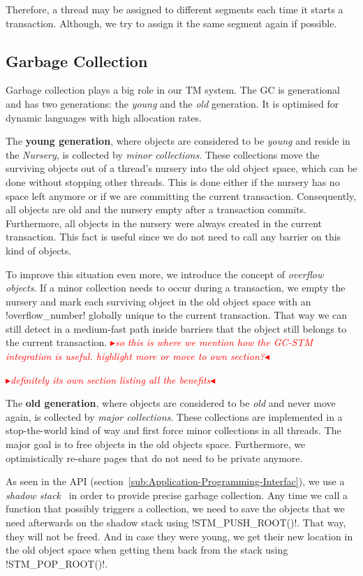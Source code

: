 \documentclass{sigplanconf}
\makeatletter
\renewcommand\lstinline[1][]{%
  \Collectverb{\@@myverb}%
}
\def\@@myverb#1{%
    \begingroup
    \fboxsep=0.2em
    \colorbox{verylightgray}{\oldlstinline|#1|}%
    \endgroup
}
\newcommand{\mynote}[2]{%
  \textcolor{red}{%
    \fbox{\bfseries\sffamily\scriptsize#1}%
    {\small$\blacktriangleright$\textsf{\emph{#2}}$\blacktriangleleft$}%
  }%
}
\newcommand\remi[1]{\mynote{Remi}{#1}}
\newcommand\cfbolz[1]{\mynote{cfbolz}{#1}}
\makeatother
\begin{document}
Therefore, a thread may be assigned to different segments each time it
starts a transaction. Although, we try to assign it the same segment
again if possible.




\subsection{Garbage Collection}

Garbage collection plays a big role in our TM system. The GC is
generational and has two generations: the \emph{young} and the
\emph{old} generation. It is optimised for dynamic languages with
high allocation rates.

The \textbf{young generation}, where objects are considered to be
\emph{young} and reside in the \emph{Nursery}, is collected by
\emph{minor collections}. These collections move the surviving objects
out of a thread's nursery into the old object space, which can be done
without stopping other threads. This is done either if the nursery has
no space left anymore or if we are committing the current
transaction. Consequently, all objects are old and the nursery empty
after a transaction commits.  Furthermore, all objects in the nursery
were always created in the current transaction. This fact is useful
since we do not need to call any barrier on this kind of objects.

To improve this situation even more, we introduce the concept of
\emph{overflow objects}. If a minor collection needs to occur during a
transaction, we empty the nursery and mark each surviving object in
the old object space with an \lstinline!overflow_number!  globally
unique to the current transaction. That way we can still detect in a
medium-fast path inside barriers that the object still belongs to the
current transaction. \remi{so this is where we mention how the GC-STM
integration is useful. highlight more or move to own section?}
\cfbolz{definitely its own section listing all the benefits}

The \textbf{old generation}, where objects are considered to be
\emph{old} and never move again, is collected by \emph{major
  collections}.  These collections are implemented in a stop-the-world
kind of way and first force minor collections in all threads. The
major goal is to free objects in the old objects space. Furthermore,
we optimistically re-share pages that do not need to be private
anymore.

As seen in the API (section~\ref{sub:Application-Programming-Interfac}),
we use a \emph{shadow stack}~\cite{fergus02} in order to provide precise garbage
collection.  Any time we call a function that possibly triggers a
collection, we need to save the objects that we need afterwards on the
shadow stack using \lstinline!STM_PUSH_ROOT()!.  That way, they will
not be freed. And in case they were young, we get their new location
in the old object space when getting them back from the stack using
\lstinline!STM_POP_ROOT()!.
\end{document}
